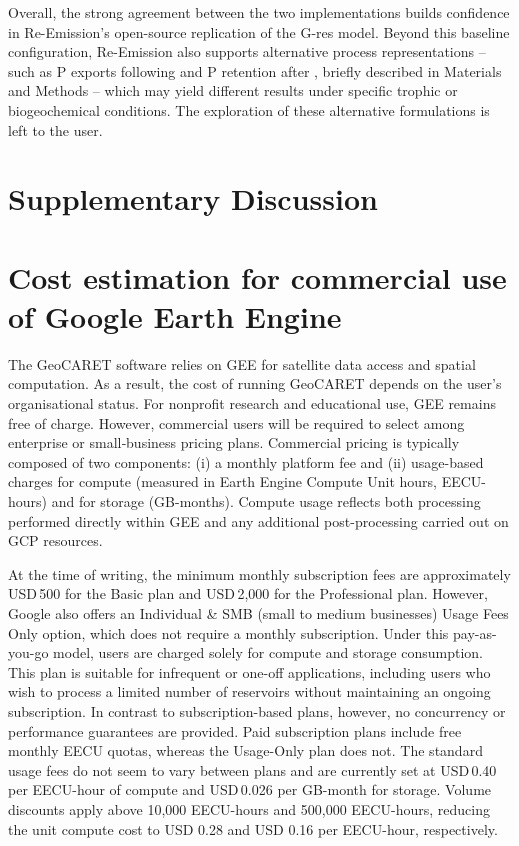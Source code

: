 \documentclass[10pt]{article}
\begin{document}
Overall, the strong agreement between the two implementations builds confidence in Re-Emission's open-source replication of the G-res model.
Beyond this baseline configuration, Re-Emission also supports alternative process representations -- such as P exports following \citet{McDowell2020} and P retention after \citet{Maavara2015}, briefly described in Materials and Methods -- which may yield different results under specific trophic or biogeochemical conditions.
The exploration of these alternative formulations is left to the user.

\section{Supplementary Discussion}
\label{supp-sec:supplementary_discussion}

\section{Cost estimation for commercial use of Google Earth Engine}
\label{supp-sec:costs}

The GeoCARET software relies on \acf{GEE} for satellite data access and spatial computation.
As a result, the cost of running GeoCARET depends on the user's organisational status.
For nonprofit research and educational use, \ac{GEE} remains free of charge.
However, commercial users will be required to select among enterprise or small‑business pricing plans.
Commercial pricing is typically composed of two components: (i) a monthly platform fee and (ii) usage-based charges for compute (measured in Earth Engine Compute Unit hours, EECU-hours) and for storage (GB-months).
Compute usage reflects both processing performed directly within \ac{GEE} and any additional post-processing carried out on \ac{GCP} resources.

At the time of writing, the minimum monthly subscription fees are approximately USD\,500 for the Basic plan and USD\,2,000 for the Professional plan.
However, Google also offers an Individual \& SMB (small to medium businesses) Usage Fees Only option, which does not require a monthly subscription. Under this pay-as-you-go model, users are charged solely for compute and storage consumption.
This plan is suitable for infrequent or one-off applications, including users who wish to process a limited number of reservoirs without maintaining an ongoing subscription.
In contrast to subscription-based plans, however, no concurrency or performance guarantees are provided.
Paid subscription plans include free monthly EECU quotas, whereas the Usage-Only plan does not.
The standard usage fees do not seem to vary between plans and are currently set at USD\,0.40 per EECU-hour of compute and USD\,0.026 per GB-month for storage.
Volume discounts apply above 10,000 EECU-hours and 500,000 EECU-hours, reducing the unit compute cost to USD 0.28 and USD 0.16 per EECU-hour, respectively.
\end{document}
